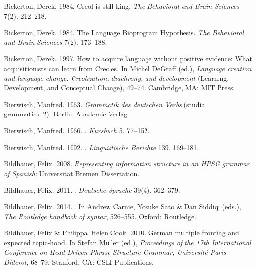 \begin{thebibliography}{1420}
Bickerton, Derek. 1984{}.
\newblock Creol is still king.
\newblock \emph{The Behavioral and Brain Sciences} 7(2). 212--218.

Bickerton, Derek. 1984{}.
\newblock The {Language Bioprogram Hypothesis}.
\newblock \emph{The Behavioral and Brain Sciences} 7(2). 173--188.

Bickerton, Derek. 1997.
\newblock How to acquire language without positive evidence: {What}
  acquisitionists can learn from {Creoles}.
\newblock In Michel DeGraff (ed.), \emph{Language creation and language change:
  Creolization, diachrony, and development}  (Learning, Development, and
  Conceptual Change), 49--74. Cambridge, MA: MIT Press.

Bierwisch, Manfred. 1963.
\newblock \emph{{Grammatik des deutschen Verbs}} (studia grammatica~2).
\newblock Berlin: Akademie Verlag.

Bierwisch, Manfred. 1966.
.
\newblock \emph{Kursbuch} 5. 77--152.

Bierwisch, Manfred. 1992.
.
\newblock \emph{Linguistische Berichte} 139. 169--181.

Bildhauer, Felix. 2008.
\newblock \emph{Representing information structure in an {HPSG} grammar of
  {Spanish}}: Universit{\"a}t Bremen Dissertation.

Bildhauer, Felix. 2011.
.
\newblock \emph{Deutsche Sprache} 39(4). 362--379.

Bildhauer, Felix. 2014.
.
\newblock In Andrew Carnie, Yosuke Sato \& Dan Siddiqi (eds.), \emph{The
  {Routledge} handbook of syntax}, 526--555. Oxford: Routledge.

Bildhauer, Felix \& Philippa~Helen Cook. 2010.
\newblock German multiple fronting and expected topic-hood.
\newblock In Stefan M{\"u}ller (ed.), \emph{Proceedings of the {17th
  International Conference on Head-Driven Phrase Structure Grammar,
  Universit{\'e} Paris Diderot}}, 68--79. Stanford, CA: CSLI Publications.


\end{thebibliography}
